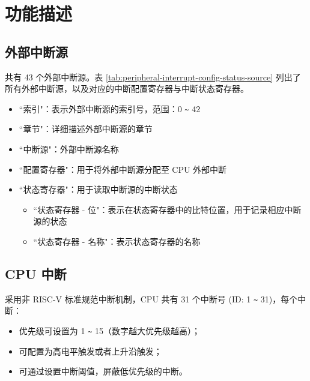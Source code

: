 \documentclass[main\_\_CN.tex]{subfiles}
\begin{document}
\section{功能描述}

\subsection{外部中断源}

\chipname{} 共有 43 个外部中断源。表 \ref{tab:peripheral-interrupt-config-status-source} 列出了所有外部中断源，以及对应的中断配置寄存器与中断状态寄存器。

\begin{itemize}
    \item ``索引"：表示外部中断源的索引号，范围：0 \verb+~+ 42
    \item ``章节"：详细描述外部中断源的章节
    \item ``中断源"：外部中断源名称
    \item ``配置寄存器"：用于将外部中断源分配至 CPU 外部中断
    \item ``状态寄存器"：用于读取中断源的中断状态
    \begin{itemize}
        \item ``状态寄存器 - 位"：表示在状态寄存器中的比特位置，用于记录相应中断源的状态 
        \item ``状态寄存器 - 名称"：表示状态寄存器的名称
    \end{itemize}
\end{itemize}

\clearpage
\begin{landscape}



\end{landscape}
\restoregeometry
\clearpage


\subsection{CPU 中断}

\chipname{} 采用非 RISC-V 标准规范中断机制，CPU 共有 31 个中断号 (ID: 1 \verb+~+ 31)，每个中断：
\begin{itemize}
    \item 优先级可设置为 1 \verb+~+ 15（数字越大优先级越高）；
    \item 可配置为高电平触发或者上升沿触发；
    \item 可通过设置中断阈值，屏蔽低优先级的中断。
\end{itemize}
\end{document}
